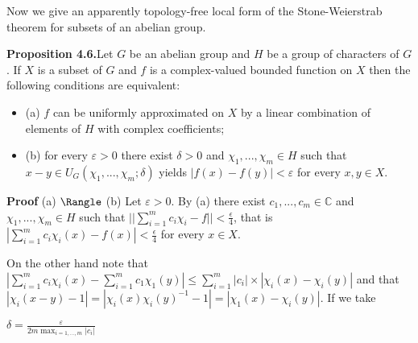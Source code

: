 \documentclass[12pt]{article}
\begin{document}
    Now we give an apparently topology-free local form of the Stone-Weierstrab theorem for subsets of an abelian group.


\textbf{Proposition 4.6.}Let $G$ be an abelian group and $H$ be a group of characters of $G$. If $X$ is a subset of $G$ and $f$ is a complex-valued
bounded function on $X$ then the following conditions are equivalent:

    \begin{itemize}

        \item (a) $f$ can be uniformly approximated on $X$ by a linear combination of elements of $H$ with complex coefficients;

        \item (b) for every $\varepsilon > 0$ there exist $\delta > 0$ and $\chi_1,...,\chi_m \in H$ such that $x - y \in U_G (\chi_1,...,\chi_m; \delta)$ yields $|f (x) - f (y)| < \varepsilon$ for every
            $x, y \in X$.

    \end{itemize}

\textbf{Proof} (a) $\Rangle$ (b) Let $\varepsilon > 0$. By (a) there exist $c_1,...,c_m \in \mathbb{C}$ and $\chi_1,...,\chi_m \in H$ such that $|| \sum^{m}_{i=1} c_i \chi_i - f || < \frac{\epsilon}{4}$, that is
$|\sum^{m}_{i=1} c_i \chi_i (x) -f(x)| < \frac{\epsilon}{4}$ for every $x \in X$.


    On the other hand note that $|\sum^{m}_{i=1} c_i \chi_i (x) - \sum^{m}_{i=1} c_1 \chi_1 (y)| \leqslant \sum^{m}_{i=1} |c_i| \times |\chi_i (x) - \chi_i (y)|$ and that
    $|\chi_i (x-y)-1| = |\chi_i (x) \chi_i (y)^{-1}-1|=|\chi_1 (x) - \chi_i(y)|$. If we take


        $\delta = \frac{\varepsilon}{2m \max_{i=1,...,m} |c_i|}$
\end{document}
